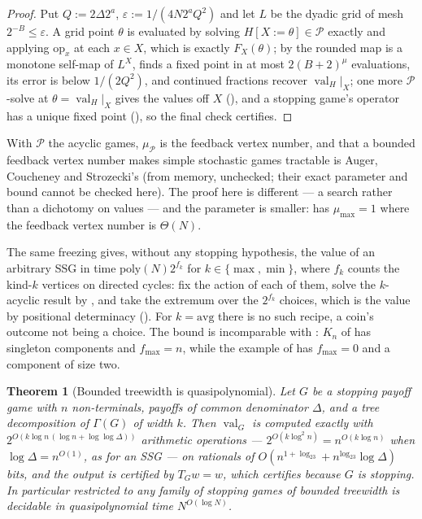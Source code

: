 \documentclass[11pt]{article}
\theoremstyle{plain}
\newtheorem{theorem}{Theorem}[section]
\theoremstyle{definition}
\DeclareMathOperator{\val}{val}
\begin{document}
\begin{proof}
Put $Q:=2\Delta2^{a}$, $\varepsilon:=1/(4N2^{a}Q^{2})$ and let $L$ be the
dyadic grid of mesh $2^{-B}\le\varepsilon$. A grid point $\theta$ is
evaluated by solving $H[X{:=}\theta]\in\mathcal P$ exactly and applying
$\mathrm{op}_x$ at each $x\in X$, which is exactly $F_X(\theta)$; by
 the rounded map is a monotone self-map of $L^{X}$,
 finds a fixed point in at most $2(B+2)^{\mu}$
evaluations, its error is below $1/(2Q^{2})$, and continued fractions
recover $\val_H|_X$; one more $\mathcal P$-solve at $\theta=\val_H|_X$
gives the values off $X$ (), and a stopping game's operator
has a unique fixed point (), so the final check
certifies.
\end{proof}

With $\mathcal P$ the acyclic games, $\mu_{\mathcal P}$ is the feedback
vertex number, and that a bounded feedback vertex number makes simple
stochastic games tractable is Auger, Coucheney and Strozecki's (from
memory, unchecked; their exact parameter and bound cannot be checked
here). The proof here is different --- a search rather than a dichotomy on
values --- and the parameter is smaller: 
has $\mu_{\max}=1$ where the feedback vertex number is $\Theta(N)$.

The same freezing gives, without any stopping hypothesis, the value of
an arbitrary SSG in time $\mathrm{poly}(N)2^{f_k}$ for
$k\in\{\max,\min\}$, where $f_k$ counts the kind-$k$ vertices on directed
cycles: fix the action of each of them, solve the $k$-acyclic result by
, and take the extremum over the $2^{f_k}$ choices,
which is the value by positional determinacy ().
For $k=\mathrm{avg}$ there is no such recipe, a coin's outcome not being
a choice. The bound is incomparable with :
$K_n$ of  has singleton components and
$f_{\max}=n$, while the example of  has $f_{\max}=0$
and a component of size two.

\begin{theorem}[Bounded treewidth is quasipolynomial]\label{thm:qp}
Let $G$ be a stopping payoff game with $n$ non-terminals, payoffs of
common denominator $\Delta$, and a tree decomposition of $\Gamma(G)$ of
width $k$. Then $\val_G$ is computed exactly with
$2^{O(k\log n\,(\log n+\log\log\Delta))}$ arithmetic operations ---
$2^{O(k\log^{2}n)}=n^{O(k\log n)}$ when $\log\Delta=n^{O(1)}$, as for an
SSG --- on rationals of
$O(n^{1+\log_23}+n^{\log_23}\log\Delta)$ bits, and the output is certified
by $T_Gw=w$, which certifies because $G$ is stopping. In particular
 restricted to any family of \emph{stopping} games of
bounded treewidth is decidable in quasipolynomial time $N^{O(\log N)}$.
\end{theorem}
\end{document}
